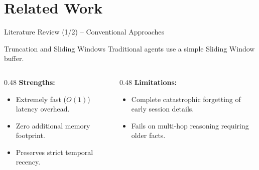 \documentclass[aspectratio=169]{beamer}
\begin{document}
\section{Related Work}

\begin{frame}{Literature Review (1/2) -- Conventional Approaches}
    \begin{block}{Truncation and Sliding Windows}
        Traditional agents use a simple Sliding Window buffer.
    \end{block}

    \begin{columns}[T]
        \begin{column}{0.48\textwidth}
            \textbf{Strengths:}
            \begin{itemize}
                \item Extremely fast ($O(1)$) latency overhead.
                \item Zero additional memory footprint.
                \item Preserves strict temporal recency.
            \end{itemize}
        \end{column}

        \begin{column}{0.48\textwidth}
            \textbf{Limitations:}
            \begin{itemize}
                \item Complete catastrophic forgetting of early session details.
                \item Fails on multi-hop reasoning requiring older facts.
            \end{itemize}
        \end{column}
    \end{columns}
\end{frame}
\end{document}
